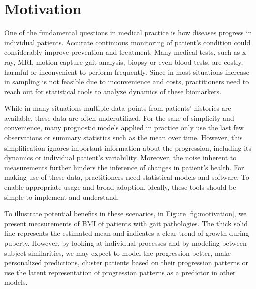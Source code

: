 \documentclass[preprint]{imsart}
\numberwithin{equation}{section}
\theoremstyle{plain}
\begin{document}
\maketitle


\section{Motivation}

One of the fundamental questions in medical practice is how diseases progress in individual patients. Accurate continuous monitoring of patient's condition could considerably improve prevention and treatment. Many medical tests, such as x-ray, MRI, motion capture gait analysis, biopsy or even blood tests, are costly, harmful or inconvenient to perform frequently. Since in most situations increase in sampling is not feasible due to inconvenience and costs, practitioners need to reach out for statistical tools to analyze dynamics of these biomarkers.

While in many situations multiple data points from patients' histories are available, these data are often underutilized. For the sake of simplicity and convenience, many prognostic models applied in practice only use the last few observations or summary statistics such as the mean over time. However, this simplification ignores important information about the progression, including its dynamics or individual patient's variability. Moreover, the noise inherent to measurements further hinders the inference of changes in patient's health. For making use of these data, practitioners need statistical models and software. To enable appropriate usage and broad adoption, ideally, these tools should be simple to implement and understand.


To illustrate potential benefits in these scenarios, in Figure \ref{fig:motivation}, we present measurements of BMI of patients with gait pathologies. The thick solid line represents the estimated mean and indicates a clear trend of growth during puberty. However, by looking at individual processes and by modeling between-subject similarities, we may expect to model the progression better, make personalized predictions, cluster patients based on their progression patterns or use the latent representation of progression patterns as a predictor in other models. 
\end{document}
